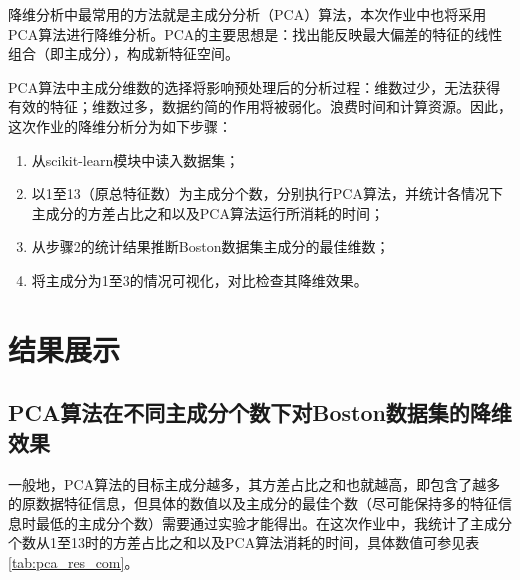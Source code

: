\documentclass[12pt,a4paper]{article}
\theoremstyle{definition}
\begin{document}
降维分析中最常用的方法就是主成分分析（PCA）算法，本次作业中也将采用PCA算法进行降维分析。PCA的主要思想是：找出能反映最大偏差的特征的线性组合（即主成分），构成新特征空间。

PCA算法中主成分维数的选择将影响预处理后的分析过程：维数过少，无法获得有效的特征；维数过多，数据约简的作用将被弱化。浪费时间和计算资源。因此，这次作业的降维分析分为如下步骤：

\begin{enumerate}
	\item 从scikit-learn模块中读入数据集；
	
	\item 以1至13（原总特征数）为主成分个数，分别执行PCA算法，并统计各情况下主成分的方差占比之和以及PCA算法运行所消耗的时间；
	
	\item 从步骤2的统计结果推断Boston数据集主成分的最佳维数；
	
	\item 将主成分为1至3的情况可视化，对比检查其降维效果。
\end{enumerate}

\section{结果展示}

\subsection{PCA算法在不同主成分个数下对Boston数据集的降维效果}
\label{sec:pca_res_com}

一般地，PCA算法的目标主成分越多，其方差占比之和也就越高，即包含了越多的原数据特征信息，但具体的数值以及主成分的最佳个数（尽可能保持多的特征信息时最低的主成分个数）需要通过实验才能得出。在这次作业中，我统计了主成分个数从1至13时的方差占比之和以及PCA算法消耗的时间，具体数值可参见表 \ref{tab:pca_res_com}。
\end{document}
